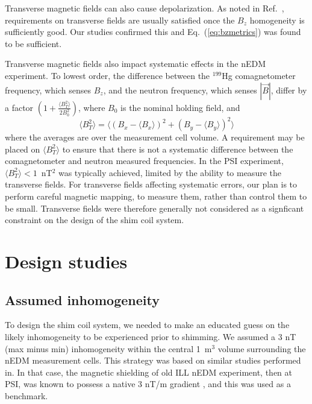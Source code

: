 \documentclass[preprint,12pt]{elsarticle}
\begin{document}
Transverse magnetic fields can also cause depolarization.  As noted in
Ref.~\cite{bib:Abel2019}, requirements on
transverse fields are usually satisfied once the $B_z$ homogeneity is
sufficiently good.  Our studies confirmed this and
Eq.~(\ref{eq:bzmetrics}) was found to be sufficient.

Transverse magnetic fields also impact systematic effects in the nEDM
experiment.  To lowest order, the difference between the $^{199}$Hg
comagnetometer frequency, which senses $B_z$, and the neutron
frequency, which senses $|\vec{B}|$, differ by a factor
$(1+\frac{\langle B_T^2\rangle}{2B_0^2})$, where $B_0$ is the nominal
holding field, and
\begin{equation}
  \langle B_T^2\rangle=\langle(B_x-\langle B_x\rangle)^2+(B_y-\langle B_y\rangle)^2\rangle
\end{equation}
where the averages are over the measurement cell volume.  A
requirement may be placed on $\langle B_T^2\rangle$ to ensure that
there is not a systematic difference between the comagnetometer and
neutron measured frequencies.  In the PSI experiment, $\langle
B_T^2\rangle < 1$~nT$^2$ was typically achieved, limited by the
ability to measure the transverse fields.  For transverse fields
affecting systematic errors, our plan is to perform careful magnetic
mapping, to measure them, rather than control them to be small.
Transverse fields were therefore generally not considered as a
signficant constraint on the design of the shim coil system.

\section{Design studies}\label{sec:designstudies}

\subsection{Assumed inhomogeneity}

To design the shim coil system, we needed to make an educated guess on
the likely inhomogeneity to be experienced prior to shimming.  We
assumed a 3 nT (max minus min) inhomogeneity within the central
1~m$^3$ volume surrounding the nEDM measurement cells.  This strategy
was based on similar studies performed in\cite{bib:klassen-msc}. In
that case, the magnetic shielding of old ILL nEDM experiment, then at
PSI, was known to possess a native 3 nT/m gradient  \cite{pendlebury2004}, 
and this was used as a benchmark.
\end{document}
